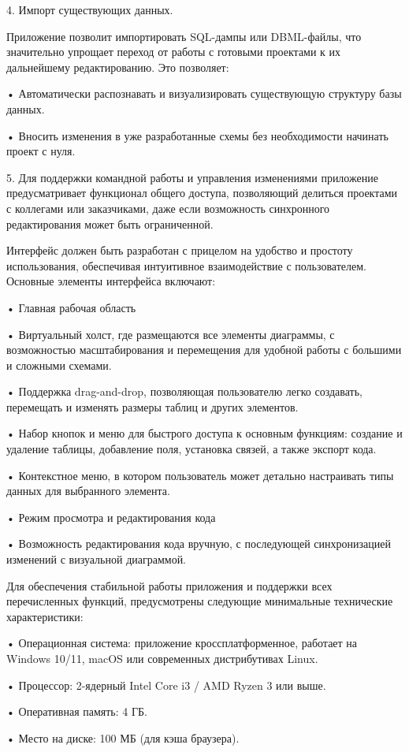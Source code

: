 4. Импорт существующих данных.

Приложение позволит импортировать SQL-дампы или DBML-файлы, что значительно упрощает переход от работы с готовыми проектами к их дальнейшему редактированию. Это позволяет:

• Автоматически распознавать и визуализировать существующую структуру базы данных.

• Вносить изменения в уже разработанные схемы без необходимости начинать проект с нуля.


5. Для поддержки командной работы и управления изменениями приложение предусматривает функционал общего доступа, позволяющий делиться проектами с коллегами или заказчиками, даже если возможность синхронного редактирования может быть ограниченной.

Интерфейс должен быть разработан с прицелом на удобство и простоту использования, обеспечивая интуитивное взаимодействие с пользователем. Основные элементы интерфейса включают:

• Главная рабочая область

• Виртуальный холст, где размещаются все элементы диаграммы, с возможностью масштабирования и перемещения для удобной работы с большими и сложными схемами.

• Поддержка drag-and-drop, позволяющая пользователю легко создавать, перемещать и изменять размеры таблиц и других элементов.

• Набор кнопок и меню для быстрого доступа к основным функциям: создание и удаление таблицы, добавление поля, установка связей, а также экспорт кода.

• Контекстное меню, в котором пользователь может детально настраивать типы данных для выбранного элемента.

• Режим просмотра и редактирования кода

• Возможность редактирования кода вручную, с последующей синхронизацией изменений с визуальной диаграммой.


Для обеспечения стабильной работы приложения и поддержки всех перечисленных функций, предусмотрены следующие минимальные технические характеристики:

 • Операционная система: приложение кроссплатформенное, работает на Windows 10/11, macOS или современных дистрибутивах Linux.
 
 • Процессор: 2-ядерный Intel Core i3 / AMD Ryzen 3 или выше.
 
 • Оперативная память: 4 ГБ.
 
 • Место на диске: 100 МБ (для кэша браузера).
 
